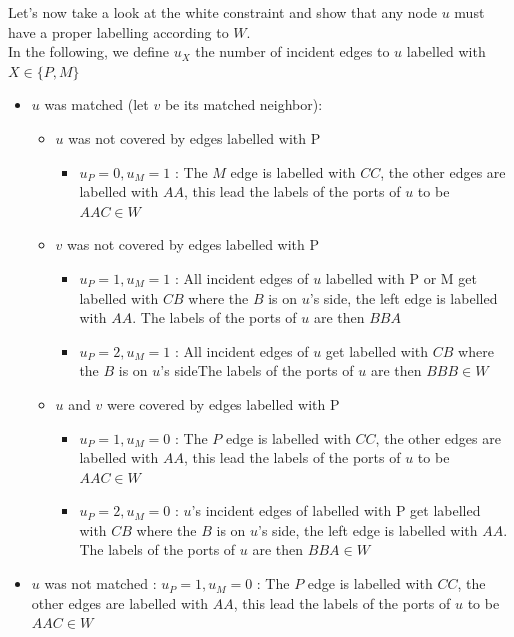 Let's now take a look at the white constraint and show that any node $u$ must have a proper labelling according to $W$.\\
In the following, we define $u_X$ the number of incident edges to $u$ labelled with $X\in\{P,M\}$
\begin{itemize}
    \item $u$ was matched (let $v$ be its matched neighbor):
    \begin{itemize}
        \item $u$ was not covered by edges labelled with P
        \begin{itemize}
            \item $u_P=0,u_M=1$ : The $M$ edge is labelled with $CC$, the other edges are labelled with $AA$, this lead the labels of the ports of $u$ to be $AAC\in W$
        \end{itemize}
        \item $v$ was not covered by edges labelled with P
        \begin{itemize}
            \item $u_P=1,u_M=1$ : All incident edges of $u$ labelled with P or M get labelled with $CB$ where the $B$ is on $u$'s side, the left edge is labelled with $AA$. The labels of the ports of $u$ are then $BBA$ 
            \item $u_P=2,u_M=1$ : All incident edges of $u$ get labelled with $CB$ where the $B$ is on $u$'s sideThe labels of the ports of $u$ are then $BBB\in W$
        \end{itemize}
        \item $u$ and $v$ were covered by edges labelled with P
        \begin{itemize}
            \item $u_P=1,u_M=0$ : The $P$ edge is labelled with $CC$, the other edges are labelled with $AA$, this lead the labels of the ports of $u$ to be $AAC\in W$
            \item $u_P=2,u_M=0$ : $u$'s incident edges of labelled with P get labelled with $CB$ where the $B$ is on $u$'s side, the left edge is labelled with $AA$. The labels of the ports of $u$ are then $BBA\in W$ 
        \end{itemize}
    \end{itemize}
    \item $u$ was not matched : $u_P=1,u_M=0$ : The $P$ edge is labelled with $CC$, the other edges are labelled with $AA$, this lead the labels of the ports of $u$ to be $AAC\in W$
\end{itemize}
    
